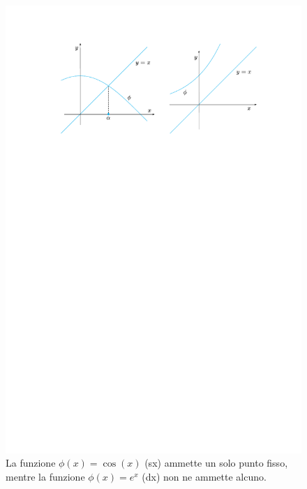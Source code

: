 \begin{figure}[!htp]
    \centering
    \includegraphics[width=\textwidth]{img/iterazioni-di-punto-fisso-1.pdf}
    \caption{La funzione $\phi\left(x\right) = \cos\left(x\right)$ (sx) ammette un solo punto fisso, mentre la funzione $\phi\left(x\right) = e^{x}$ (dx) non ne ammette alcuno.}
    \label{fig: non tutte le funzioni hanno un punto fisso}
\end{figure}

\hfill

